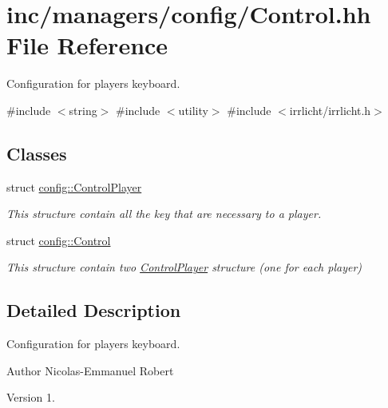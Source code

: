 \hypertarget{Control_8hh}{}\section{inc/managers/config/\+Control.hh File Reference}
\label{Control_8hh}


Configuration for player\textquotesingle{}s keyboard.  


{\ttfamily \#include $<$string$>$}\newline
{\ttfamily \#include $<$utility$>$}\newline
{\ttfamily \#include $<$irrlicht/irrlicht.\+h$>$}\newline
\subsection*{Classes}
\begin{DoxyCompactItemize}
\item 
struct \hyperlink{structconfig_1_1ControlPlayer}{config\+::\+Control\+Player}
\begin{DoxyCompactList}\small\item\em This structure contain all the key that are necessary to a player. \end{DoxyCompactList}\item 
struct \hyperlink{structconfig_1_1Control}{config\+::\+Control}
\begin{DoxyCompactList}\small\item\em This structure contain two \hyperlink{structconfig_1_1ControlPlayer}{Control\+Player} structure (one for each player) \end{DoxyCompactList}\end{DoxyCompactItemize}


\subsection{Detailed Description}
Configuration for player\textquotesingle{}s keyboard. 

\begin{DoxyAuthor}{Author}
Nicolas-\/\+Emmanuel Robert 
\end{DoxyAuthor}
\begin{DoxyVersion}{Version}
1. 
\end{DoxyVersion}
